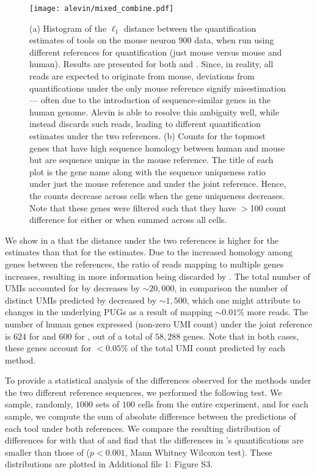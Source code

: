   \begin{figure}[!htb]
      \centering
    \texttt{[image: alevin/mixed\_combine.pdf]}
    \caption{(a) Histogram of the $\ell_{1}$ distance between the
        quantification estimates of tools on the mouse neuron 900 data, when run
        using different references for quantification (just mouse versus mouse and
        human). Results are presented for both \alevin and \cellr. Since, in
        reality, all reads are expected to originate from mouse, deviations from
        quantifications under the only mouse reference signify misestimation ---
        often due to the introduction of sequence-similar genes in the human
        genome. Alevin is able to resolve this ambiguity well, while \cellr
        instead discards such reads, leading to different quantification estimates
        under the two references. (b) Counts for the topmost genes that have high sequence homology between human 
        and mouse but are sequence unique in the mouse reference. The title of each plot is the gene name 
        along with the sequence uniqueness ratio under just the mouse reference and under the joint reference. Hence, the
        \cellr counts decrease across cells when the gene uniqueness decreases. Note that these genes were filtered such
        that they have $>$100 count difference for either \alevin or \cellr when summed across all cells. }
    \label{fig:mixedanalysis}
  \end{figure}
  
  We show in a that the distance under
  the two references is higher for the \cellr estimates than that for the
  \alevin estimates. Due to the increased homology among genes between the
  references, the ratio of reads mapping to multiple genes increases, resulting
  in more information being discarded by \cellr. The total number of UMIs
  accounted for by \cellr decreases by $\sim20,000$, in comparison the number of
  distinct UMIs predicted by \alevin decreased by $\sim1,500$, which one might
  attribute to changes in the underlying PUGs as a result of mapping
  $\sim0.01\%$ more reads. The number of human genes expressed (non-zero UMI count)
  under the joint reference is $624$ for \cellr and $600$ for \alevin, out of a total of $58,288$ genes. 
  Note that in both cases, these genes account for $<0.05\%$ of the total UMI count predicted by each 
  method.

  To provide a statistical analysis of the differences observed for the methods
  under the two different reference sequences, we performed the following test.
  We sample, randomly, $1000$ sets of $100$ cells from the entire experiment,
  and for each sample, we compute the sum of absolute difference between the
  predictions of each tool under both references. We compare the resulting
  distribution of differences for \cellr with that of \alevin and find that the
  differences in \alevin's quantifications are smaller than those of \cellr ($p < 0.001$, Mann Whitney Wilcoxon test). 
  These distributions are plotted in Additional file 1: Figure S3.

